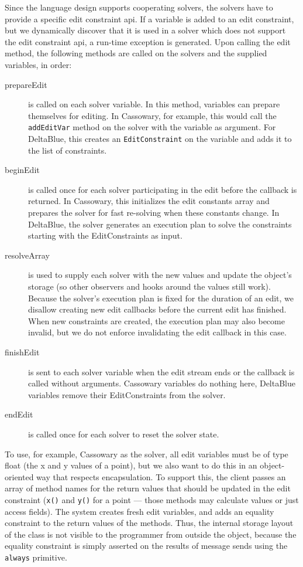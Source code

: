 Since the language design supports cooperating solvers, the solvers have to
provide a specific edit constraint \ac{api}\@. If a variable is added to an edit
constraint, but we dynamically discover that it is used in a solver which does
not support the edit constraint \ac{api}, a run-time exception is generated.
Upon calling the edit method, the following methods are called on the solvers
and the supplied variables, in order:
\begin{description}
\item[prepareEdit] is called on each solver variable. In this method, variables
  can prepare themselves for editing. In Cassowary, for example, this would call
  the \lstinline{addEditVar} method on the solver with the variable as
  argument. For DeltaBlue, this creates an \lstinline{EditConstraint} on the
  variable and adds it to the list of constraints.
\item[beginEdit] is called once for each solver participating in the edit before
  the callback is returned. In Cassowary, this initializes the edit constants
  array and prepares the solver for fast re-solving when these constants
  change. In DeltaBlue, the solver generates an execution plan to solve the
  constraints starting with the EditConstraints as input.
\item[resolveArray] is used to supply each solver with the new values and update
  the object's storage (so other observers and hooks around the values still
  work). Because the solver's execution plan is fixed for the duration of an
  edit, we disallow creating new edit callbacks before the current edit has
  finished. When new constraints are created, the execution plan may also become
  invalid, but we do not enforce invalidating the edit callback in this case.
\item[finishEdit] is sent to each solver variable when the edit stream ends or
  the callback is called without arguments. Cassowary variables do nothing here,
  DeltaBlue variables remove their EditConstraints from the solver.
\item[endEdit] is called once for each solver to reset the solver state.
\end{description}

To use, for example, Cassowary as the solver, all edit variables must be of type
float (\eg the x and y values of a point), but we also want to do this in an
object-oriented way that respects encapsulation. To support this, the client
passes an array of method names for the return values that should be updated in
the edit constraint (\eg \lstinline{x()} and \lstinline{y()} for a point ---
those methods may calculate values or just access fields).  The system creates
fresh edit variables, and adds an equality constraint to the return values of
the methods. Thus, the internal storage layout of the class is not visible to
the programmer from outside the object, because the equality constraint is
simply asserted on the results of message sends using the \lstinline{always}
primitive.

